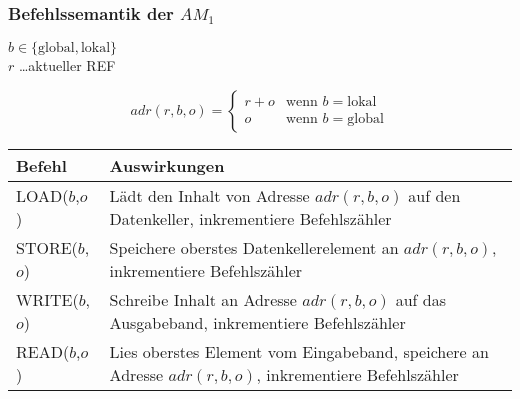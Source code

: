 \documentclass[aspectratio=1610,onlymath, ngerman]{beamer}
\renewcommand{\emph}[1]{\textbf{#1}}
\begin{document}
	\begin{frame} \frametitle{Befehlssemantik der $AM_1$}
	\small
		\begin{minipage}{\dimexpr0.5\linewidth-\fboxrule-\fboxsep}
			$b \in \{ \text{global}, \text{lokal}\}$ \\
			$r$ \dots aktueller REF
		\end{minipage}
		\begin{minipage}{\dimexpr0.5\linewidth-\fboxrule-\fboxsep}
			\begin{equation*}
				adr(r,b,o) = \begin{cases}
				r+o & \text{wenn } b = \text{lokal} \\
				o & \text{wenn } b = \text{global}
				\end{cases}
			\end{equation*}
		\end{minipage}
		
		\smallskip
		
		\begin{tabular}{p{2cm} p{\dimexpr\linewidth-\fboxrule-\fboxsep-2cm}}
			\emph{Befehl} & \emph{Auswirkungen}  \\ \hline
			LOAD($b$,$o$) & Lädt den Inhalt von Adresse $adr(r,b,o)$ auf den Datenkeller, inkrementiere Befehlszähler \\
			STORE($b$,$o$) & Speichere oberstes Datenkellerelement an $adr(r,b,o)$, inkrementiere Befehlszähler \\
			WRITE($b$,$o$) & Schreibe Inhalt an Adresse $adr(r,b,o)$ auf das
			Ausgabeband, inkrementiere Befehlszähler \\
			READ($b$,$o$) & Lies oberstes Element vom Eingabeband, speichere
			an Adresse $adr(r,b,o)$, inkrementiere Befehlszähler \\
		\end{tabular}
	\end{frame}
\end{document}
